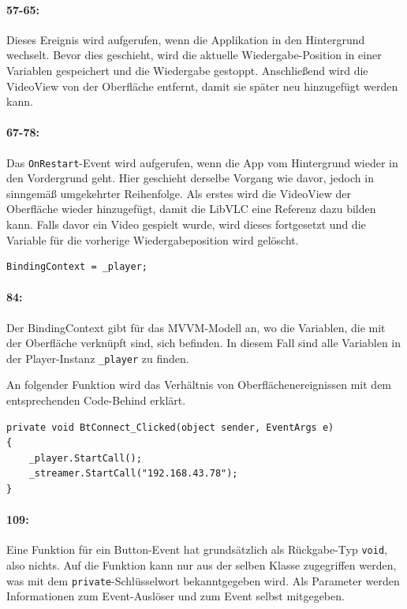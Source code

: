 \paragraph{57-65:} Dieses Ereignis wird aufgerufen, wenn die Applikation in den Hintergrund wechselt.
Bevor dies geschieht, wird die aktuelle Wiedergabe-Position in einer Variablen gespeichert und die Wiedergabe gestoppt.
Anschließend wird die VideoView von der Oberfläche entfernt, damit sie später neu hinzugefügt werden kann.
\paragraph{67-78:} Das \texttt{OnRestart}-Event wird aufgerufen, wenn die App vom Hintergrund wieder in den Vordergrund geht.
Hier geschieht derselbe Vorgang wie davor, jedoch in sinngemäß umgekehrter Reihenfolge.
Als erstes wird die VideoView der Oberfläche wieder hinzugefügt, damit die LibVLC eine Referenz dazu bilden kann.
Falls davor ein Video gespielt wurde, wird dieses fortgesetzt und die Variable für die vorherige Wiedergabeposition wird gelöscht.

\begin{verbatim}
BindingContext = _player;
\end{verbatim}
\paragraph{84:} Der BindingContext gibt für das MVVM-Modell an, wo die Variablen, die mit der Oberfläche verknüpft sind, sich befinden.
In diesem Fall sind alle Variablen in der Player-Instanz \texttt{\_player} zu finden.

An folgender Funktion wird das Verhältnis von Oberflächenereignissen mit dem entsprechenden Code-Behind erklärt.
\begin{verbatim}
private void BtConnect_Clicked(object sender, EventArgs e)
{
    _player.StartCall();
    _streamer.StartCall("192.168.43.78");
}
\end{verbatim}
\paragraph{109:} Eine Funktion für ein Button-Event hat grundsätzlich als Rückgabe-Typ \texttt{void}, also nichts.
Auf die Funktion kann nur aus der selben Klasse zugegriffen werden, was mit dem \texttt{private}-Schlüsselwort bekanntgegeben wird.
Als Parameter werden Informationen zum Event-Auslöser und zum Event selbst mitgegeben.
